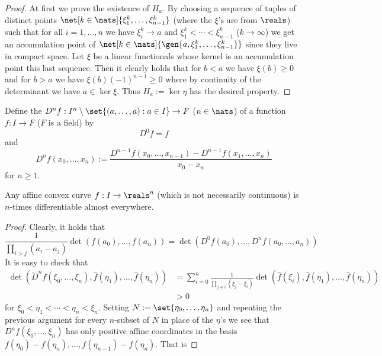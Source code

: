 \begin{proof}
    At first we prove the existence of $H_a$. By choosing a sequence of tuples of distinct points $\net[k\in\nats]{\xi^k_1,\ldots,\xi^k_{n-1}}$ (where the $\xi$'s are from $\reals$) such that for all $i=1,\ldots,n$ we have $\xi^k_i\to a$ and $\xi^k_1<\cdots<\xi^k_{n-1}$ ($k\to\infty$) we get an accumulation point of $\net[k\in\nats]{\gen{a,\xi^k_1,\ldots,\xi^k_{n-1}}}$ since they live in compact space. Let $\xi$ be a linear functionals whose kernel is an accumulation point this last sequence. Then it clearly holds that for $b<a$ we have $\xi(b)\geq 0$ and for $b>a$ we have $\xi(b){(-1)}^{n-1}\geq 0$ where by continuity of the determinant we have $a\in\ker{\xi}$. Thus $H_a:=\ker{\eta}$ has the desired property.
\end{proof}

\begin{definition}
    Define the  $D^n{f}:I^n\setminus\set{(a,\ldots,a):a\in I}\to F$ ($n\in\nats$) of a function $f:I\to F$ ($F$ is a field) by
    $$
    D^0f=f
    $$
    and
    $$
    D^n{f}(x_0,\ldots,x_n):=\frac{D^{n-1}{f}(x_0,\ldots,x_{n-1})-D^{n-1}{f}(x_1,\ldots,x_n)}{x_0-x_n}
    $$
    for $n\geq 1$.
\end{definition}


\begin{lemma}
    Any affine convex curve $f:I\to \reals^n$ (which is not necessarily continuous) is $n$-times differentiable almost everywhere. 
\end{lemma}

\begin{proof}
    Clearly, it holds that
    $$
    \frac{1}{\prod_{i>j}{(a_i-a_j)}}\det(f(a_0),\ldots,f(a_n))=\det(D^0{f}(a_0),\ldots,D^n{f}(a_0,\ldots,a_n))
    $$
    It is easy to check that
    \begin{align*}
        \det(\check{D}^n{f}(\xi_0,\ldots,\xi_n),\hat{f}(\eta_1),\ldots,\hat{f}(\eta_n))
        & = \sum_{i=0}^{n}{\frac{1}{\prod_{j\neq  i}{(\xi_j-\xi_i)}}\det(\hat{f}(\xi_i),\hat{f}(\eta_1),\ldots,\hat{f}(\eta_n))}\\
        & > 0
    \end{align*}
    for $\xi_0<\eta_1<\cdots<\eta_n<\xi_n$. Setting $N:=\set{\eta_0,\ldots,\eta_n}$ and repeating the previous argument for every $n$-subset of $N$ in place of the $\eta$'s we see that $D^n{f}(\xi_0,\ldots,\xi_n)$ has only positive affine coordinates in the basis $f(\eta_0)-f(\eta_n),\ldots,f(\eta_{n-1})-f(\eta_n)$. That is

\end{proof}



